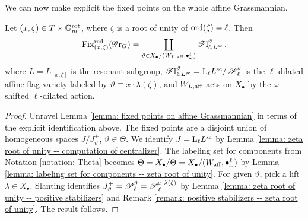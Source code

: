 We can now make explicit the fixed points on the whole affine Grassmannian.
\begin{theorem}\label{lemma: fixed points of (c, zeta) on Gr_G -- zeta root of unity}
Let $(x, \zeta) \in T \times \mathbb{G}_m^{\mathrm{rot}}$, where $\zeta$ is a root of unity of $\mathrm{ord}(\zeta) = \ell$. Then
\begin{equation*}
    \operatorname{Fix}^{\operatorname{red}}_{(x, \zeta)}(\operatorname{\mathscr{G}r}_G) = \coprod_{\vartheta \in X_{\bullet}/(W_{L, \mathrm{aff}}, \bullet^{\ell}_{\omega})} \operatorname{\mathscr{F}l}^{\vartheta}_{\ell, L^{\mathrm{sc}}}.
\end{equation*}
where $L=L_{[x, \zeta]}$ is the resonant subgroup, $\operatorname{\mathscr{F}l}^{\vartheta}_{\ell, L^{\mathrm{sc}}} = \mathrm{L}_{\ell} L^{\mathrm{sc}}/ \operatorname{\mathscr{P}}^{\vartheta}_{\ell}$ is the $\ell$-dilated affine flag variety labeled by $\vartheta \equiv x \cdot \lambda(\zeta)$, and $W_{L, \mathrm{aff}}$ acts on $X_{\bullet}$ by the $\omega$-shifted $\ell$-dilated action.
\end{theorem}
\begin{proof}
Unravel Lemma \ref{lemma: fixed points on affine Grassmannian} in terms of the explicit identification above. The fixed points are a disjoint union of homogeneous spaces $J/J^+_{\vartheta}$, $\vartheta \in \Theta$. We identify $J = \mathrm{L}_{\ell} L^{\mathrm{sc}}$ by Lemma \ref{lemma: zeta root of unity -- computation of centralizer}. The labeling set for components from Notation \ref{notation: Theta} becomes $\Theta = X_{\bullet} / \Theta = X_{\bullet}/(W_{\mathrm{aff}}, \bullet^{\ell}_{\omega} ) $ by Lemma \ref{lemma: labeling set for components -- zeta root of unity}. 
For given $\vartheta$, pick a lift $\lambda \in X_{\bullet}$. Slanting identifies $J^+_{\vartheta} = \operatorname{\mathscr{P}}^{\vartheta}_{\ell} = \operatorname{\mathscr{P}}^{x \cdot \lambda(\zeta)}_{\ell}$ by Lemma \ref{lemma: zeta root of unity -- positive stabilizers} and Remark \ref{remark: positive stabilizers -- zeta root of unity}. The result follows.
\end{proof}


